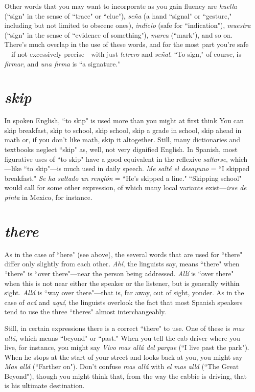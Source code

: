 Other words that you may want to incorporate as you gain fluency are \emph{huella} (``sign" in the sense of ``trace" or ``clue"), \emph{seña} (a hand
``signal" or ``gesture," including but not limited to obscene ones), \emph{indicio} (safe for ``indication"), \emph{muestra} (``sign" in the sense of ``evidence
of something"), \emph{marca} (``mark"), and so on. There's much overlap in
the use of these words, and for the most part you're safe---if not excessively precise---with just \emph{letrero} and \emph{señal}. ``To sign," of course, is \emph{firmar}, and \emph{una firma} is ``a signature."

\section{\emph{skip}}

In spoken English, ``to skip" is used more than you might at
first think You can skip breakfast, skip to school, skip school, skip a
grade in school, skip ahead in math or, if you don't like math, skip it
altogether. Still, many dictionaries and textbooks neglect ``skip" as,
well, not very dignified English. In Spanish, most figurative uses of
``to skip" have a good equivalent in the reflexive \emph{saltarse}, which---like
``to skip"---is much used in daily speech. \emph{Me salté el desayuno} = ``I
skipped breakfast." \emph{Se ha saltado un renglón} = ``He's skipped a line."
``Skipping school" would call for some other expression, of which
many local variants exist---\emph{irse de pinta} in Mexico, for instance.

\section{\emph{there}}

As in the case of ``here" (see above), the several words that are
used for ``there" differ only slightly from each other. \emph{Ahí}, the linguists
say, means ``there" when ``there" is ``over there"---near the person
being addressed. \emph{Allí} is ``over there" when this is not near either the
speaker or the listener, but is generally within sight. \emph{Allá} is ``way over
there"---that is, far away, out of sight, yonder. As in the case of \emph{acá} and
\emph{aquí}, the linguists overlook the fact that most Spanish speakers tend
to use the three ``theres" almost interchangeably.

Still, in certain expressions there is a correct ``there" to use.
One of these is \emph{mas allá}, which means ``beyond" or ``past." When you
tell the cab driver where you live, for instance, you might say \emph{Vivo
mas allá del parque} (``I live past the park"). When he stops at the start
of your street and looks back at you, you might say \emph{Mas allá} (``Farther
on"). Don't confuse \emph{mas allá} with \emph{el mas allá} (``The Great Beyond"),
though you might think that, from the way the cabbie is driving, that
is his ultimate destination.

